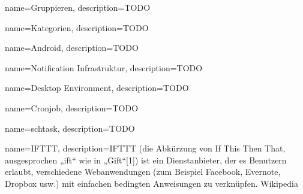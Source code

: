 {
  name=Gruppieren,
  description={TODO}
} 

{
  name=Kategorien,
  description={TODO }
} 

{
  name=Android,
  description={TODO}
} 

{
  name=Notification Infrastruktur,
  description={TODO}
} 

{
  name=Desktop Environment,
  description={TODO}
} 

{
  name=Cronjob,
  description={TODO}
} 

{
  name=schtask,
  description={TODO}
} 

{
  name=IFTTT,
  description={IFTTT (die Abkürzung von If This Then That, ausgesprochen „ift“ wie in „Gift“[1]) ist ein Dienstanbieter, der es Benutzern erlaubt, verschiedene Webanwendungen (zum Beispiel Facebook, Evernote, Dropbox usw.) mit einfachen bedingten Anweisungen zu verknüpfen. Wikipedia}
} 





